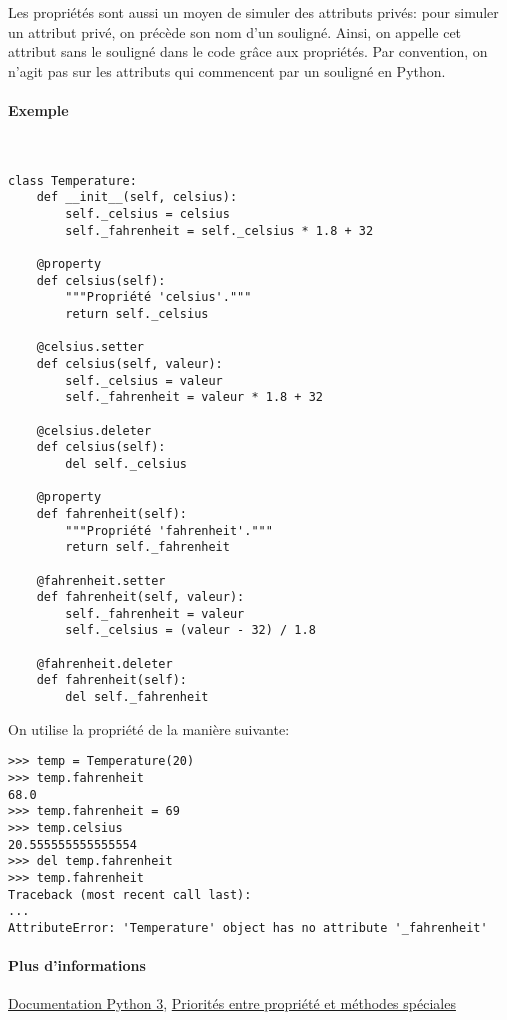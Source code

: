 Les propriétés sont aussi un moyen de simuler des attributs privés: pour simuler un attribut privé, on précède son nom d'un souligné. Ainsi, on appelle cet attribut sans le souligné dans le code grâce aux propriétés. Par convention, on n'agit pas sur les attributs qui commencent par un souligné en Python.

\paragraph{Exemple}~
\begin{verbatim}
class Temperature:
    def __init__(self, celsius):
        self._celsius = celsius
        self._fahrenheit = self._celsius * 1.8 + 32

    @property
    def celsius(self):
        """Propriété 'celsius'."""
        return self._celsius

    @celsius.setter
    def celsius(self, valeur):
        self._celsius = valeur
        self._fahrenheit = valeur * 1.8 + 32

    @celsius.deleter
    def celsius(self):
        del self._celsius
    
    @property
    def fahrenheit(self):
        """Propriété 'fahrenheit'."""
        return self._fahrenheit
    
    @fahrenheit.setter
    def fahrenheit(self, valeur):
        self._fahrenheit = valeur
        self._celsius = (valeur - 32) / 1.8

    @fahrenheit.deleter
    def fahrenheit(self):
        del self._fahrenheit
\end{verbatim}

On utilise la propriété de la manière suivante:
\begin{verbatim}
>>> temp = Temperature(20)
>>> temp.fahrenheit
68.0
>>> temp.fahrenheit = 69
>>> temp.celsius
20.555555555555554
>>> del temp.fahrenheit
>>> temp.fahrenheit
Traceback (most recent call last):
...
AttributeError: 'Temperature' object has no attribute '_fahrenheit'
\end{verbatim}

\paragraph{Plus d'informations}\href{https://docs.python.org/fr/3/library/functions.html?highlight=property#property}{Documentation Python 3}, \href{https://stackoverflow.com/questions/15750522/class-properties-and-setattr/15751159#15751159}{Priorités entre propriété et méthodes spéciales}

